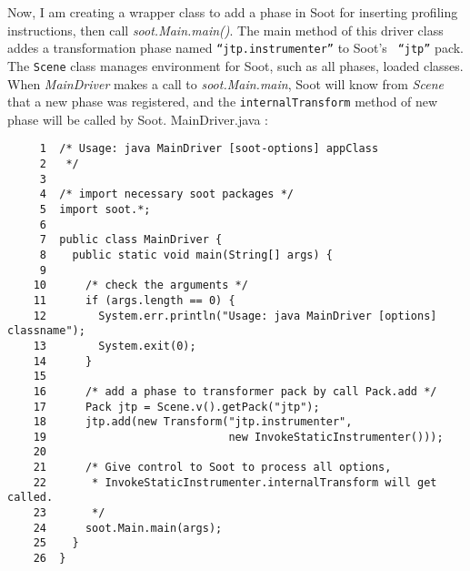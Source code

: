 \documentclass[12pt]{article}
\begin{document}
\noindent
Now, I am creating a wrapper class to add a phase in Soot for
inserting profiling instructions, then call {\em
soot.Main.main()}. The main method of this driver class addes a
transformation phase named {\tt ``jtp.instrumenter''} to Soot's {\tt
``jtp''} pack. The {\tt Scene} class manages environment for Soot,
such as all phases, loaded classes. When {\em MainDriver} makes a call
to {\em soot.Main.main}, Soot will know from {\em Scene} that a new
phase was registered, and the {\tt internalTransform} method of
new phase will be called by Soot.  
{\Large MainDriver.java :}
\begin{verbatim}
     1  /* Usage: java MainDriver [soot-options] appClass
     2   */
     3
     4  /* import necessary soot packages */
     5  import soot.*;
     6
     7  public class MainDriver {
     8    public static void main(String[] args) {
     9
    10      /* check the arguments */
    11      if (args.length == 0) {
    12        System.err.println("Usage: java MainDriver [options] classname");
    13        System.exit(0);
    14      }
    15
    16      /* add a phase to transformer pack by call Pack.add */
    17      Pack jtp = Scene.v().getPack("jtp");
    18      jtp.add(new Transform("jtp.instrumenter",
    19                            new InvokeStaticInstrumenter()));
    20
    21      /* Give control to Soot to process all options,
    22       * InvokeStaticInstrumenter.internalTransform will get called.
    23       */
    24      soot.Main.main(args);
    25    }
    26  }
\end{verbatim}
\end{document}
